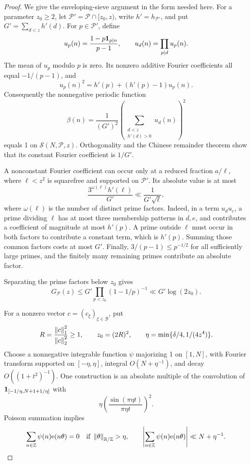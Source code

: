 \begin{proof}
We give the enveloping-sieve argument in the form needed here.
For a parameter \(z_0\ge2\), let
\(\mathcal P'=\mathcal P\cap[z_0,z)\), write \(h'=h_{\mathcal P'}\),
and put \(G'=\sum_{d<z}h'(d)\). For \(p\in\mathcal P'\), define
\[
 u_p(n)=\frac{1-p\mathbf 1_{p\mid n}}{p-1},\qquad
 u_d(n)=\prod_{p\mid d}u_p(n).
\]
The mean of \(u_p\) modulo \(p\) is zero. Its nonzero additive
Fourier coefficients all equal \(-1/(p-1)\), and
\[
 u_p(n)^2=h'(p)+(h'(p)-1)u_p(n).
\]
Consequently the nonnegative periodic function
\begin{equation}\label{eq:majorant}
 \beta(n)=\frac1{(G')^2}
       \left(\sum_{\substack{d<z\\h'(d)>0}}u_d(n)\right)^2
\end{equation}
equals 1 on \(\mathcal S(N,\mathcal P,z)\).
Orthogonality and the Chinese remainder theorem show that its
constant Fourier coefficient is \(1/G'\).

A nonconstant Fourier coefficient can occur only at a reduced
fraction \(a/\ell\), where \(\ell<z^2\) is squarefree and supported
on \(\mathcal P'\). Its absolute value is at most
\begin{equation}\label{eq:majorant-coeff}
 \frac{3^{\omega(\ell)}h'(\ell)}{G'}
 \ll \frac1{G'\sqrt{\ell}},
\end{equation}
where \(\omega(\ell)\) is the number of distinct prime factors.
Indeed, in a term \(u_d u_e\), a prime dividing \(\ell\) has at
most three membership patterns in \(d,e\), and contributes a
coefficient of magnitude at most \(h'(p)\). A prime outside
\(\ell\) must occur in both factors to contribute a constant
term, which is \(h'(p)\). Summing those common factors costs
at most \(G'\). Finally, \(3/(p-1)\le p^{-1/2}\) for all
sufficiently large primes, and the finitely many remaining primes
contribute an absolute factor.

Separating the prime factors below \(z_0\) gives
\begin{equation}\label{eq:G-comparison}
 G_{\mathcal P}(z)
 \le G'\prod_{p<z_0}(1-1/p)^{-1}
 \ll G'\log(2z_0).
\end{equation}

For a nonzero vector \(c=(c_\xi)_{\xi\in\mathcal B}\), put
\[
 R=\frac{\left\lVert c\right\rVert_1^2}{\left\lVert c\right\rVert_2^2}\ge1,\qquad z_0=(2R)^2,
 \qquad \eta=\min\{\delta/4,1/(4z^4)\}.
\]
Choose a nonnegative integrable function \(\psi\) majorizing 1
on \([1,N]\), with Fourier transform supported on
\([-\eta,\eta]\), integral \(O(N+\eta^{-1})\), and decay
\(O((1+t^2)^{-1})\). One construction is an absolute multiple
of the convolution of
\(\mathbf 1_{[-1/\eta,N+1+1/\eta]}\) with
\[
 \eta\left(\frac{\sin(\pi\eta t)}{\pi\eta t}\right)^2.
\]
Poisson summation implies
\[
 \sum_{n\in\mathbb Z}\psi(n)\mathrm e(n\theta)=0
 \quad\text{if }\left\lVert \theta\right\rVert_{\mathbb R/\mathbb Z}>\eta,
 \qquad
 \left|\sum_{n\in\mathbb Z}\psi(n)\mathrm e(n\theta)\right|
 \ll N+\eta^{-1}.
\]


\end{proof}
